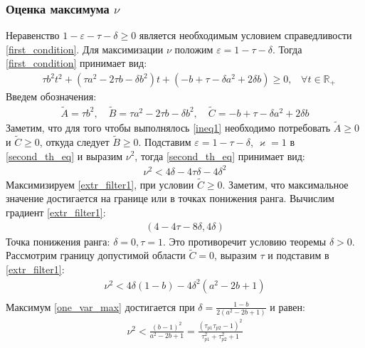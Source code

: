 \documentclass[a4paper,article,14pt]{extarticle}
\begin{document}
\subsubsection{Оценка максимума $\nu$}
Неравенство $1 - \varepsilon - \tau - \delta \geqslant 0$ является необходимым условием справедливости \eqref{first_condition}. Для максимизации $\nu$ положим $\varepsilon = 1 - \tau - \delta$. Тогда \eqref{first_condition} принимает вид:
\begin{equation}\label{ineq1} 
 \begin{aligned}
&\tau b^2t^2 + (\tau a^2-2 \tau b - \delta b^2)t + (- b+\tau-\delta a^2 + 2\delta b) \geqslant 0 \text{,}\quad \forall t \in \mathbb{R_+}
 \end{aligned}
\end{equation}
Введем обозначения:
\begin{equation}
 \begin{aligned}
\widetilde A = \tau b^2, \quad 
\widetilde B = \tau a^2-2 \tau b - \delta b^2, \quad
\widetilde C = - b+\tau-\delta a^2 + 2\delta b
 \end{aligned}
\end{equation}
Заметим, что для того чтобы выполнялось \eqref{ineq1} необходимо потребовать $\widetilde A \geqslant 0$ и $\widetilde C \geqslant 0$, откуда следует $\widetilde B \geqslant 0$. Подставим $\varepsilon = 1 - \tau - \delta$, $\varkappa = 1$ в \eqref{second_th_eq} и выразим $\nu^2$, тогда \eqref{second_th_eq} принимает вид:
\begin{equation}\label{extr_filter1}
 \begin{aligned}
\nu^2 < 4\delta-4\tau\delta - 4\delta^2
 \end{aligned}
\end{equation} 
Максимизируем \eqref{extr_filter1}, при условии $\widetilde C \geqslant 0$.  Заметим, что максимальное значение достигается на границе или в точках понижения ранга. Вычислим градиент \eqref{extr_filter1}:
\begin{equation}
 \begin{aligned}
(4 - 4\tau - 8\delta, 4\delta)
 \end{aligned}
\end{equation} 
Точка понижения ранга: $\delta = 0, \tau = 1$. Это противоречит условию теоремы $\delta > 0$. Рассмотрим границу допустимой области $\widetilde C = 0$, выразим $\tau$ и подставим в \eqref{extr_filter1}:
\begin{equation}\label{one_var_max}
 \begin{aligned}
\nu^2 < 4\delta(1 - b) - 4\delta^2(a^2 -2b +1)\\
 \end{aligned}
\end{equation} 
Максимум  \eqref{one_var_max} достигается при $\delta = \frac{1-b}{2(a^2 - 2b + 1)}$ и равен:
\begin{equation}\label{filter1_max}
 \begin{aligned}
\nu^2 < \frac{(b - 1)^2}{a^2 - 2b + 1} = \frac{(\tau_{p1}\tau_{p2} - 1)^2}{\tau_{p1}^2 + \tau_{p2}^2 + 1}
 \end{aligned}
\end{equation} 
\end{document}
